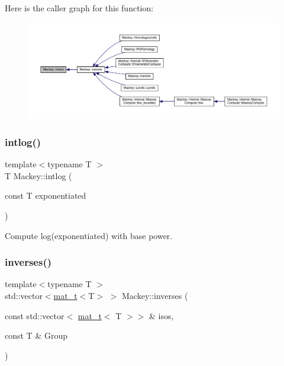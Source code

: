 Here is the caller graph for this function\+:\nopagebreak
\begin{figure}[H]
\begin{center}
\leavevmode
\includegraphics[width=350pt]{namespaceMackey_a4904fdc0fdcf3c23d7f3b80f59b2eafa_icgraph}
\end{center}
\end{figure}
\mbox{\label{namespaceMackey_aa0cac9097035c5fe8448742e22e6f78b}} 
\subsubsection{\texorpdfstring{intlog()}{intlog()}}
{\footnotesize\ttfamily template$<$typename T $>$ \\
T Mackey\+::intlog (\begin{DoxyParamCaption}\item[{const T}]{exponentiated }\end{DoxyParamCaption})\hspace{0.3cm}{\ttfamily [inline]}}



Compute log(exponentiated) with base power. 

\mbox{\label{namespaceMackey_a8c1525b210b4699780bbe05cb16f0e7b}} 
\subsubsection{\texorpdfstring{inverses()}{inverses()}}
{\footnotesize\ttfamily template$<$typename T $>$ \\
std\+::vector$<$\hyperlink{namespaceMackey_a035386035757dade630f685e508e5cf9}{mat\+\_\+t}$<$T$>$ $>$ Mackey\+::inverses (\begin{DoxyParamCaption}\item[{const std\+::vector$<$ \hyperlink{namespaceMackey_a035386035757dade630f685e508e5cf9}{mat\+\_\+t}$<$ T $>$$>$ \&}]{isos,  }\item[{const T \&}]{Group }\end{DoxyParamCaption})}




